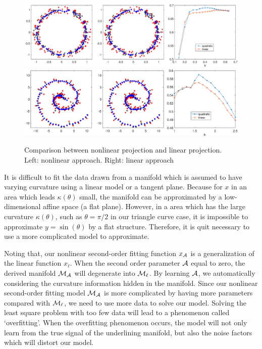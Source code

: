 \documentclass{article}
\theoremstyle{remark}
\begin{document}
\begin{figure}[H] %
   \centering
    \includegraphics[width=\linewidth]{circle_result.eps} 
     \includegraphics[width=\linewidth]{swiss_roll.eps} 
     \vspace{-0.4cm}
   \caption{Comparison between nonlinear projection and linear projection. Left: nonlinear approach. Right: linear approach}
   \label{fig:sin_curve}
\end{figure}

It is difficult to fit the data drawn from a manifold which is assumed to have varying curvature using a linear model or a tangent plane. Because for $x$ in an area which leads $\kappa(\theta)$ small, the manifold can be approximated by a low-dimensional affine space (a flat plane). However, in a area which has the large curvature $\kappa(\theta)$, such as $\theta=\pi/2$ in our triangle curve case, it is impossible to approximate $y = \sin(\theta)$ by a flat structure. Therefore, it is quit necessary to use a more complicated model to approximate. 

Noting that, our nonlinear second-order fitting function $x_{\cal A}$ is a generalization of the linear function $x_\ell$. When the second order parameter $\cal A$ equal to zero, the derived manifold $\cal M_A$ will degenerate into ${\cal M}_\ell$. By learning $\cal A$, we automatically considering the curvature information hidden in the manifold. Since our nonlinear second-order fitting model $\cal M_A$ is more complicated by having more parameters compared with ${\cal M}_\ell$, we need to use more data to solve our model. Solving the least square problem with too few data will lead to a phenomenon called `overfitting'. When the overfitting phenomenon occurs, the model will not only learn from the true signal of the underlining manifold, but also the noise factors which will distort our model.
\end{document}
